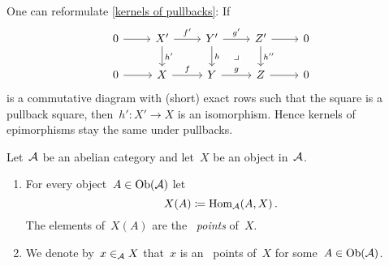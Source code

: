 \begin{remark*}
  One can reformulate \cref{kernels of pullbacks}:
  If
  \[
    \begin{tikzcd}
        0
        \arrow{r}
      & X'
        \arrow{r}[above]{f'}
        \arrow{d}[right]{h'}
      & Y'
        \arrow{r}[above]{g'}
        \arrow{d}[right]{h}
        \arrow[phantom]{dr}[description]{\pb}
      & Z'
        \arrow{r}
        \arrow{d}[right]{h''}
      & 0
      \\
        0
        \arrow{r}
      & X
        \arrow{r}[above]{f}
      & Y
        \arrow{r}[above]{g}
      & Z
        \arrow{r}
      & 0
    \end{tikzcd}
  \]
  is a commutative diagram with (short) exact rows such that the  square is a pullback square, then~$h' \colon X' \to X$ is an isomorphism.
  Hence kernels of epimorphisms stay the same under pullbacks.
\end{remark*}


\begin{remarkdefinition}[label=abstract points]
  Let~$\mathcal{A}$ be an abelian category and let~$X$ be an object in~$\mathcal{A}$.
  \begin{enumerate}
    \item
      For every object~$A \in \operatorname{Ob}(\mathcal{A})$ let
      \[
                  X(A)
        \coloneqq  \operatorname{Hom}_{\mathcal{A}}(A,X) \,.
      \]
      The elements of~$X(A)$ are the~\emph{ points} of~$X$.
    \item
      We denote by~$x  \in_{\mathcal{A}} X$ that~$x$ is an~ points of~$X$ for some~$A \in \operatorname{Ob}(\mathcal{A})$.
  \end{enumerate}
\end{remarkdefinition}


